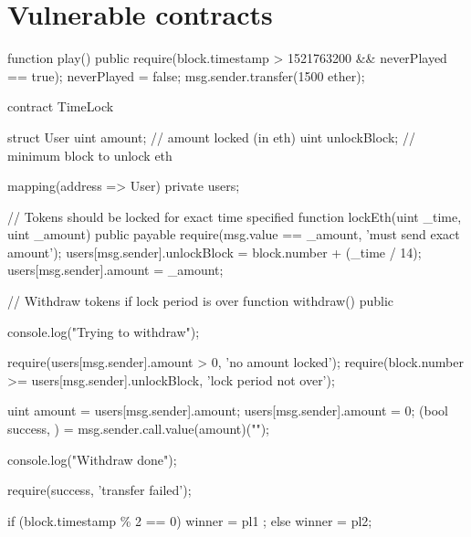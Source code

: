 \section{Vulnerable contracts}

\begin{solidity}[caption=NCC Group - Time manipulation \cite{DASP2018}]
    function play() public {
        require(block.timestamp > 1521763200 && neverPlayed == true);
        neverPlayed = false;
        msg.sender.transfer(1500 ether);
    }
\end{solidity}

\begin{solidity}[caption=SWC116 \cite{swc116}]
contract TimeLock {
    struct User {
        uint amount; // amount locked (in eth)
        uint unlockBlock; // minimum block to unlock eth
    }

    mapping(address => User) private users;

    // Tokens should be locked for exact time specified
    function lockEth(uint _time, uint _amount) public payable {
        require(msg.value == _amount, 'must send exact amount');
        users[msg.sender].unlockBlock = block.number + (_time / 14);
        users[msg.sender].amount = _amount;
    }

    // Withdraw tokens if lock period is over
    function withdraw() public {
        console.log("Trying to withdraw");

        require(users[msg.sender].amount > 0, 'no amount locked');
        require(block.number >= users[msg.sender].unlockBlock, 'lock period not over');

        uint amount = users[msg.sender].amount;
        users[msg.sender].amount = 0;
        (bool success, ) = msg.sender.call.value(amount)("");

        console.log("Withdraw done");

        require(success, 'transfer failed');
    }
}
\end{solidity}

\begin{solidity}[caption=Timestamp depended contract \cite{SmartCheck2018}]
    if (block.timestamp \% 2 == 0) winner = pl1 ; else winner = pl2;
\end{solidity}

%     
%     
